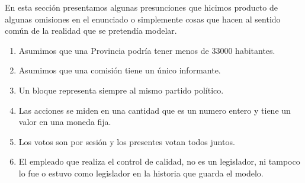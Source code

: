 En esta secci\'on presentamos algunas presunciones que hicimos producto de algunas omisiones en el enunciado o simplemente cosas que hacen al sentido com\'un de la realidad que se pretend\'ia modelar.

\begin{enumerate}
	\item Asumimos que una Provincia podr\'ia tener menos de 33000 habitantes.
	\item Asumimos que una comisi\'on tiene un \'unico informante.
	\item Un bloque representa siempre al mismo partido pol\'itico.
	\item Las acciones se miden en una cantidad que es un numero entero y tiene un valor en una moneda fija.
	\item Los votos son por sesi\'on y los presentes votan todos juntos. 
	\item El empleado que realiza el control de calidad, no es un legislador, ni tampoco lo fue o estuvo como legislador en la historia que guarda el modelo.	
\end{enumerate}
